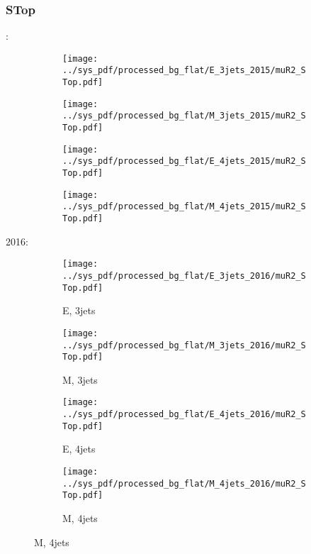 \documentclass{beamer}
\begin{document}
\begin{frame}
\frametitle{STop}
\fontsize{5}{1}:
\begin{figure}
\centering
\begin{subfigure}[b]{0.24\textwidth}
\texttt{[image: ../sys\_pdf/processed\_bg\_flat/E\_3jets\_2015/muR2\_STop.pdf]}
\end{subfigure}
\begin{subfigure}[b]{0.24\textwidth}
\texttt{[image: ../sys\_pdf/processed\_bg\_flat/M\_3jets\_2015/muR2\_STop.pdf]}
\end{subfigure}
\begin{subfigure}[b]{0.24\textwidth}
\texttt{[image: ../sys\_pdf/processed\_bg\_flat/E\_4jets\_2015/muR2\_STop.pdf]}
\end{subfigure}
\begin{subfigure}[b]{0.24\textwidth}
\texttt{[image: ../sys\_pdf/processed\_bg\_flat/M\_4jets\_2015/muR2\_STop.pdf]}
\end{subfigure}
\end{figure}
2016:
\begin{figure}
\centering
\begin{subfigure}[b]{0.24\textwidth}
\texttt{[image: ../sys\_pdf/processed\_bg\_flat/E\_3jets\_2016/muR2\_STop.pdf]}
\captionsetup{font=tiny}
\caption{E, 3jets}
\end{subfigure}
\begin{subfigure}[b]{0.24\textwidth}
\texttt{[image: ../sys\_pdf/processed\_bg\_flat/M\_3jets\_2016/muR2\_STop.pdf]}
\captionsetup{font=tiny}
\caption{M, 3jets}
\end{subfigure}
\begin{subfigure}[b]{0.24\textwidth}
\texttt{[image: ../sys\_pdf/processed\_bg\_flat/E\_4jets\_2016/muR2\_STop.pdf]}
\captionsetup{font=tiny}
\caption{E, 4jets}
\end{subfigure}
\begin{subfigure}[b]{0.24\textwidth}
\texttt{[image: ../sys\_pdf/processed\_bg\_flat/M\_4jets\_2016/muR2\_STop.pdf]}
\captionsetup{font=tiny}
\caption{M, 4jets}
\end{subfigure}
\end{figure}
\end{frame}
\end{document}
